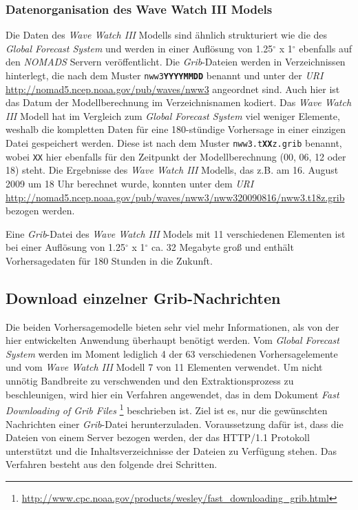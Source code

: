 \subsubsection{Datenorganisation des Wave Watch III Models}
Die Daten des \textit{Wave Watch III} Modells sind ähnlich
strukturiert wie die des \textit{Global Forecast System} und werden in
einer Auflösung von 1.25$^{\circ}$ x 1$^{\circ}$ ebenfalls auf den
\textit{NOMADS} Servern veröffentlicht. Die \textit{Grib}-Dateien
werden in Verzeichnissen hinterlegt, die nach dem Muster
\texttt{nww3\textbf{YYYYMMDD}} benannt und unter der \textit{URI}
\url{http://nomad5.ncep.noaa.gov/pub/waves/nww3} angeordnet sind. Auch
hier ist das Datum der Modellberechnung im Verzeichnisnamen
kodiert. Das \textit{Wave Watch III} Modell hat im Vergleich zum
\textit{Global Forecast System} viel weniger Elemente, weshalb die
kompletten Daten für eine 180-stündige Vorhersage in einer einzigen
Datei gespeichert werden. Diese ist nach dem Muster
\texttt{nww3.t\textbf{XX}z.grib} benannt, wobei \texttt{XX} hier
ebenfalls für den Zeitpunkt der Modellberechnung (00, 06, 12 oder 18)
steht. Die Ergebnisse des \textit{Wave Watch III} Modells, das z.B. am
16. August 2009 um 18 Uhr berechnet wurde, konnten unter dem
\textit{URI}
\url{http://nomad5.ncep.noaa.gov/pub/waves/nww3/nww320090816/nww3.t18z.grib}
bezogen werden.

Eine \textit{Grib}-Datei des \textit{Wave Watch III} Models mit 11
verschiedenen Elementen ist bei einer Auflösung von
1.25$^{\circ}$ x 1$^{\circ}$ ca. 32 Megabyte groß und enthält
Vorhersagedaten für 180 Stunden in die Zukunft.

\subsection{Download einzelner Grib-Nachrichten}
\label{subsec:download}
Die beiden Vorhersagemodelle bieten sehr viel mehr Informationen, als
von der hier entwickelten Anwendung überhaupt benötigt werden. Vom
\textit{Global Forecast System} werden im Moment lediglich 4 der 63
verschiedenen Vorhersagelemente und vom \textit{Wave Watch III} Modell
7 von 11 Elementen verwendet. Um nicht unnötig Bandbreite zu
verschwenden und den Extraktionsprozess zu beschleunigen, wird hier
ein Verfahren angewendet, das in dem Dokument \textit{Fast Downloading
  of Grib Files}
\footnote{\url{http://www.cpc.noaa.gov/products/wesley/fast_downloading_grib.html}}
beschrieben ist. Ziel ist es, nur die gewünschten Nachrichten einer
\textit{Grib}-Datei herunterzuladen. Voraussetzung dafür ist, dass die
Dateien von einem Server bezogen werden, der das HTTP/1.1 Protokoll
unterstützt und die Inhaltsverzeichnisse der Dateien zu Verfügung
stehen. Das Verfahren besteht aus den folgende drei Schritten.

